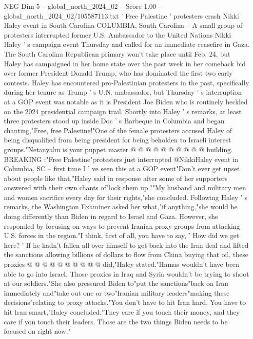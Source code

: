 \begin{textsample}{NEG Dim 5 – global\_north\_2024\_02 – Score 1.00 – global\_north\_2024\_02/105587113.txt}  \label{ex:f5_neg_214}
' Free Palestine ' protesters crash Nikki Haley event in South Carolina COLUMBIA, South Carolina -- A small group of protesters interrupted former U.S.
Ambassador to the United Nations Nikki Haley ' s campaign event Thursday and called for an immediate ceasefire in Gaza.
The South Carolina Republican primary won't take place until Feb. 24, but Haley has campaigned in her home state over the past week in her comeback bid over former President Donald Trump, who has dominated the first two early contests.
Haley has encountered pro-Palestinian protesters in the past, specifically during her tenure as Trump ' s U.N. ambassador, but Thursday ' s interruption at a GOP event was notable as it is President Joe Biden who is routinely heckled on the 2024 presidential campaign trail.
Shortly into Haley ' s remarks, at least three protesters stood up inside Doc ' s Barbeque in Columbia and began chanting,"Free, free Palestine!"One of the female protesters accused Haley of being disqualified from being president for being beholden to Israeli interest groups."Netanyahu is your puppet master @ @ @ @ @ @ @ @ @ @ building.
BREAKING :"Free Palestine"protesters just interrupted @NikkiHaley event in Columbia, SC -- first time I ' ve seen this at a GOP event"Don't ever get upset about people like that,"Haley said in response after some of her supporters answered with their own chants of"lock them up.""My husband and military men and women sacrifice every day for their rights,"she concluded.
Following Haley ' s remarks, the Washington Examiner asked her what,"if anything,"she would be doing differently than Biden in regard to Israel and Gaza.
However, she responded by focusing on ways to prevent Iranian proxy groups from attacking U.S. forces in the region."I think, first of all, you have to say, ' How did we get here? ' If he hadn't fallen all over himself to get back into the Iran deal and lifted the sanctions allowing billions of dollars to flow from China buying that oil, these proxies @ @ @ @ @ @ @ @ @ @ did,"Haley stated."Hamas wouldn't have been able to go into Israel.
Those proxies in Iraq and Syria wouldn't be trying to shoot at our soldiers."She also pressured Biden to"put the sanctions"back on Iran immediately and"take out one or two"Iranian military leaders"making these decisions"relating to proxy attacks."You don't have to hit Iran hard.
You have to hit Iran smart,"Haley concluded."They care if you touch their money, and they care if you touch their leaders.
Those are the two things Biden needs to be focused on right now."

\end{textsample}

